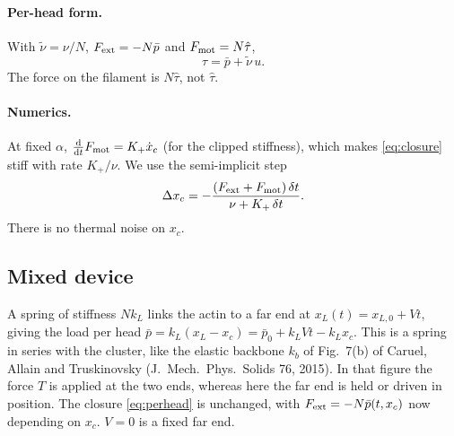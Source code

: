 \documentclass[11pt,a4paper]{article}
\newcommand{\dd}{\mathrm{d}}
\begin{document}
\paragraph{Per-head form.} With $\tilde\nu=\nu/N$, $F_{\rm ext}=-N\bar p$ and $F_{\rm mot}=N\hat\tau$,
\begin{equation}
\hat\tau=\bar p+\tilde\nu\,u .
\label{eq:perhead}
\end{equation}
The force on the filament is $N\hat\tau$, not $\hat\tau$.

\paragraph{Numerics.} At fixed $\alpha$, $\frac{\dd}{\dd t}F_{\rm mot}=K_+\dot x_c$ (for the clipped stiffness), which makes \eqref{eq:closure} stiff with rate $K_+/\nu$. We use the semi-implicit step
\begin{equation}
\Delta x_c=-\frac{(F_{\rm ext}+F_{\rm mot})\,\delta t}{\nu+K_+\,\delta t}.
\end{equation}
There is no thermal noise on $x_c$.

\subsection{Mixed device}
A spring of stiffness $Nk_L$ links the actin to a far end at $x_L(t)=x_{L,0}+Vt$, giving the load per head $\bar p=k_L(x_L-x_c)=\bar p_0+k_LVt-k_Lx_c$. This is a spring in series with the cluster, like the elastic backbone $k_b$ of Fig.~7(b) of Caruel, Allain and Truskinovsky (J.\ Mech.\ Phys.\ Solids 76, 2015). In that figure the force $T$ is applied at the two ends, whereas here the far end is held or driven in position. The closure \eqref{eq:perhead} is unchanged, with $F_{\rm ext}=-N\bar p(t,x_c)$ now depending on $x_c$. $V=0$ is a fixed far end.
\end{document}

